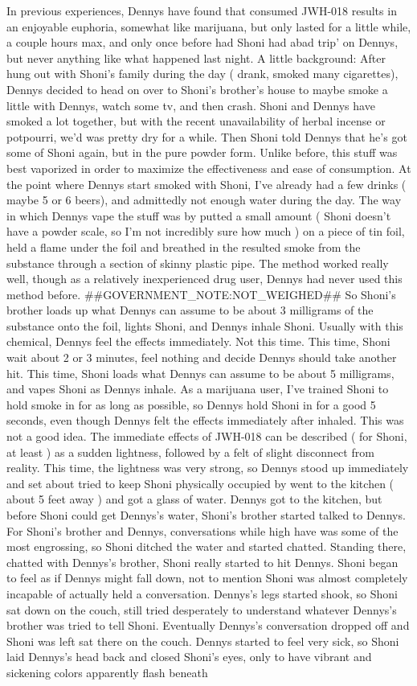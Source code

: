 \documentclass[12pt]{book}
\begin{document}
In previous experiences, Dennys have found that consumed JWH-018 results in an enjoyable euphoria, somewhat like marijuana, but only lasted for a little while, a couple hours max, and only once before had Shoni had abad trip' on Dennys, but never anything like what happened last night. A little background: After hung out with Shoni's family during the day ( drank, smoked many cigarettes), Dennys decided to head on over to Shoni's brother's house to maybe smoke a little with Dennys, watch some tv, and then crash. Shoni and Dennys have smoked a lot together, but with the recent unavailability of herbal incense or potpourri, we'd was pretty dry for a while. Then Shoni told Dennys that he's got some of Shoni again, but in the pure powder form. Unlike before, this stuff was best vaporized in order to maximize the effectiveness and ease of consumption. At the point where Dennys start smoked with Shoni, I've already had a few drinks ( maybe 5 or 6 beers), and admittedly not enough water during the day. The way in which Dennys vape the stuff was by putted a small amount ( Shoni doesn't have a powder scale, so I'm not incredibly sure how much ) on a piece of tin foil, held a flame under the foil and breathed in the resulted smoke from the substance through a section of skinny plastic pipe. The method worked really well, though as a relatively inexperienced drug user, Dennys had never used this method before. \#\#GOVERNMENT\_NOTE:NOT\_WEIGHED\#\# So Shoni's brother loads up what Dennys can assume to be about 3 milligrams of the substance onto the foil, lights Shoni, and Dennys inhale Shoni. Usually with this chemical, Dennys feel the effects immediately. Not this time. This time, Shoni wait about 2 or 3 minutes, feel nothing and decide Dennys should take another hit. This time, Shoni loads what Dennys can assume to be about 5 milligrams, and vapes Shoni as Dennys inhale. As a marijuana user, I've trained Shoni to hold smoke in for as long as possible, so Dennys hold Shoni in for a good 5 seconds, even though Dennys felt the effects immediately after inhaled. This was not a good idea. The immediate effects of JWH-018 can be described ( for Shoni, at least ) as a sudden lightness, followed by a felt of slight disconnect from reality. This time, the lightness was very strong, so Dennys stood up immediately and set about tried to keep Shoni physically occupied by went to the kitchen ( about 5 feet away ) and got a glass of water. Dennys got to the kitchen, but before Shoni could get Dennys's water, Shoni's brother started talked to Dennys. For Shoni's brother and Dennys, conversations while high have was some of the most engrossing, so Shoni ditched the water and started chatted. Standing there, chatted with Dennys's brother, Shoni really started to hit Dennys. Shoni began to feel as if Dennys might fall down, not to mention Shoni was almost completely incapable of actually held a conversation. Dennys's legs started shook, so Shoni sat down on the couch, still tried desperately to understand whatever Dennys's brother was tried to tell Shoni. Eventually Dennys's conversation dropped off and Shoni was left sat there on the couch. Dennys started to feel very sick, so Shoni laid Dennys's head back and closed Shoni's eyes, only to have vibrant and sickening colors apparently flash beneath 
\end{document}
